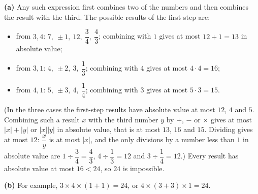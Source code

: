 \textbf{(a)} Any such expression first combines two of the numbers and then combines the result with the third. The possible results of the first step are:
\begin{itemize}
\item from $3,4$: $7,\ \pm1,\ 12,\ \dfrac34,\ \dfrac43$; combining with $1$ gives at most $12+1=13$ in absolute value;
\item from $3,1$: $4,\ \pm2,\ 3,\ \dfrac13$; combining with $4$ gives at most $4\cdot4=16$;
\item from $4,1$: $5,\ \pm3,\ 4,\ \dfrac14$; combining with $3$ gives at most $5\cdot3=15$.
\end{itemize}
(In the three cases the first-step results have absolute value at most $12$, $4$ and $5$. Combining such a result $x$ with the third number $y$ by $+$, $-$ or $\times$ gives at most $|x|+|y|$ or $|x||y|$ in absolute value, that is at most $13$, $16$ and $15$. Dividing gives at most $12$: $\dfrac xy$ is at most $|x|$, and the only divisions by a number less than $1$ in absolute value are $1\div\dfrac34=\dfrac43$, $4\div\dfrac13=12$ and $3\div\dfrac14=12$.) Every result has absolute value at most $16<24$, so $24$ is impossible.

\textbf{(b)} For example, $\boxed{3\times4\times(1+1)=24}$, or $4\times(3+3)\times1=24$.
